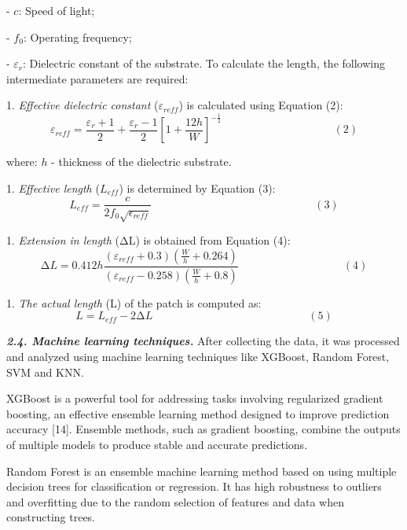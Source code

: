 - \(c\): Speed of light;

- \(f_{0}\)\hspace{0pt}: Operating frequency;

- \(\varepsilon_{r}\)\hspace{0pt}: Dielectric constant of the substrate.
To calculate the length, the following intermediate parameters are
required:


1. \emph{Effective dielectric constant} (\(\varepsilon_{reff}\)) is
calculated using Equation (2):
\[\varepsilon_{reff} = \frac{\varepsilon_{r} + 1}{2} + \frac{\varepsilon_{r} - 1}{2}\left\lbrack 1 + \frac{12h}{W} \right\rbrack^{- \frac{1}{2}}\ \ \ \ \ \ \ \ \ \ \ \ \ \ \ \ \ \ \ \ \ \ \ \ \ \ \ \ \ \ \ \ \ \ \ \ \ \ \ \ \ \ \ \ \ \ (2)\]

where: \(h\) - thickness of the dielectric substrate.

\setcounter{enumi}{1}

1. \emph{Effective length} (\(L_{eff}\)) is determined by Equation (3):
\[L_{eff} = \frac{c}{2f_{0}\sqrt{\epsilon_{reff}}}\ \ \ \ \ \ \ \ \ \ \ \ \ \ \ \ \ \ \ \ \ \ \ \ \ \ \ \ \ \ \ \ \ \ \ \ \ \ \ \ \ \ \ \ \ \ \ \ \ \ \ \ \ \ \ \ \ \ \ \ \ \ \ \ \ \ \ (3)\]

\setcounter{enumi}{2}

1. \emph{Extension in length} (ΔL) is obtained from Equation (4):
\[\mathrm{\Delta}L = 0.412h\frac{(\varepsilon_{reff} + 0.3)(\frac{W}{h} + 0.264)}{(\varepsilon_{reff} - 0.258)(\frac{W}{h} + 0.8)}\ \ \ \ \ \ \ \ \ \ \ \ \ \ \ \ \ \ \ \ \ \ \ \ \ \ \ \ \ \ \ \ \ \ \ \ \ \ \ \ \ \ \ (4)\]

\setcounter{enumi}{3}

1. \emph{The actual length} (L) of the patch is computed as:
\[L = L_{eff} - 2\mathrm{\Delta}L\ \ \ \ \ \ \ \ \ \ \ \ \ \ \ \ \ \ \ \ \ \ \ \ \ \ \ \ \ \ \ \ \ \ \ \ \ \ \ \ \ \ \ \ \ \ \ \ \ \ \ \ \ \ \ \ \ \ \ \ \ \ \ \ (5)\]

\emph{{\bfseries 2.4. Machine learning techniques.}} After collecting the
data, it was processed and analyzed using machine learning techniques
like XGBoost, Random Forest, SVM and KNN.

XGBoost is a powerful tool for addressing tasks involving regularized
gradient boosting, an effective ensemble learning method designed to
improve prediction accuracy {[}14{]}. Ensemble methods, such as gradient
boosting, combine the outputs of multiple models to produce stable and
accurate predictions.

Random Forest is an ensemble machine learning method based on using
multiple decision trees for classification or regression. It has high
robustness to outliers and overfitting due to the random selection of
features and data when constructing trees.

